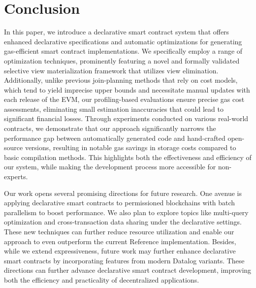 \section{Conclusion}

In this paper, we introduce a declarative smart contract system that offers enhanced declarative specifications and automatic optimizations for generating gas-efficient smart contract implementations. We specifically employ a range of optimization techniques, prominently featuring a novel and formally validated selective view materialization framework that utilizes view elimination.
Additionally, unlike previous join-planning methods that rely on cost models, which tend to yield imprecise upper bounds and necessitate manual updates with each release of the EVM, our profiling-based evaluations ensure precise gas cost assessments, eliminating small estimation inaccuracies that could lead to significant financial losses.
Through experiments conducted on various real-world contracts, we demonstrate that our approach significantly narrows the performance gap between automatically generated code and hand-crafted open-source versions, resulting in notable gas savings in storage costs compared to basic compilation methods. This highlights both the effectiveness and efficiency of our system, while making the development process more accessible for non-experts.

Our work opens several promising directions for future research. One avenue is applying declarative smart contracts to permissioned blockchains with batch parallelism to boost performance. We also plan to explore topics like multi-query optimization and cross-transaction data sharing under the declarative settings. These new techniques can further reduce resource utilization and enable our approach to even outperform the current Reference implementation.
Besides, while we extend expressiveness, future work may further enhance declarative smart contracts by incorporating features from modern Datalog variants.
These directions can further advance declarative smart contract development, improving both the efficiency and practicality of decentralized applications.